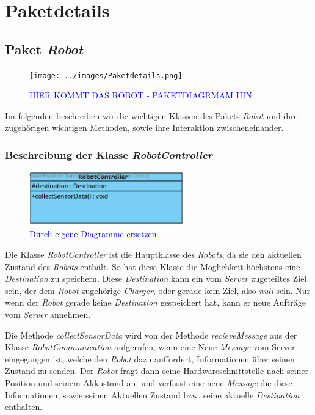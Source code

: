 \section{Paketdetails}

\subsection{Paket \textit{Robot}}
	\begin{figure}[H]
	\centering
	\texttt{[image: ../images/Paketdetails.png]}
	\caption{\textcolor{blue}{HIER KOMMT DAS ROBOT - PAKETDIAGRMAM HIN}}
	\label{Paketdetails}
	\end{figure}
	Im folgenden beschreiben wir die wichtigen Klassen des Pakets \textit{Robot} 
	und ihre zugehörigen wichtigen Methoden, sowie ihre Interaktion zwischeneinander. 


	\subsubsection{Beschreibung der Klasse \textit{RobotController}}
		\begin{figure}[H]
		\centering
		\includegraphics[width=0.6\textwidth]{../images/Iteration0_Entwurf_7-1-1_Klasse_RobotController.svg}
		\caption{\textcolor{blue}{Durch eigene Diagramme ersetzen}}
		\label{BeschreibungKlasse1}
		\end{figure}
		
		Die Klasse \textit{RobotController} ist die Hauptklasse des \textit{Robots}, 
		da sie den aktuellen Zustand des \textit{Robots} enthält.
		So hat diese Klasse die Möglichkeit höchstens eine \textit{Destination} zu speichern. 
		Diese \textit{Destination} kann ein vom \textit{Server} zugeteiltes Ziel sein, 
		der dem \textit{Robot} zugehörige \textit{Charger}, oder gerade kein Ziel, 
		also \textit{null} sein. Nur wenn der \textit{Robot} gerade keine \textit{Destination} 
		gespeichert hat, kann er neue Aufträge vom \textit{Server} annehmen.

			Die Methode \textit{collectSensorData} wird von der Methode \textit{recieveMessage} 
			aus der Klasse \textit{RobotCommunication} aufgerufen, wenn eine Neue \textit{Message} 
			vom Server eingegangen ist, welche den \textit{Robot} dazu auffordert, Informationen 
			über seinen Zustand zu senden. Der \textit{Robot} fragt dann seine Hardwareschnittstelle 
			nach seiner Position und seinem Akkustand an, und verfasst eine neue \textit{Message} 
			die diese Informationen, sowie seinen Aktuellen Zustand bzw. seine aktuelle \textit{Destination} enthalten.

